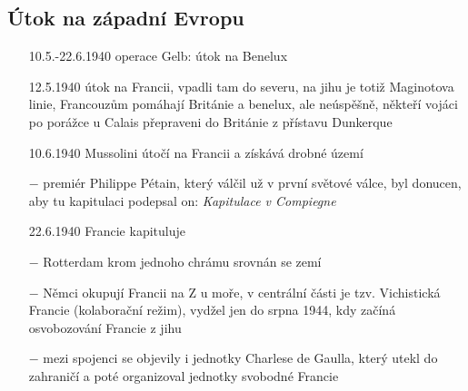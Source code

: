 \documentclass{article}
\begin{document}
\subsection*{Útok na západní Evropu}
\begin{itemize}
    \vspace{-0.5em}
    \setlength\itemsep{0.15em}
    \item[10.5.-22.6.1940] operace Gelb: útok na Benelux
    \item[12.5.1940] útok na Francii, vpadli tam do severu, na jihu je totiž Maginotova linie, Francouzům pomáhají Británie a benelux, ale neúspěšně, někteří vojáci po porážce u Calais přepraveni do Británie z přístavu Dunkerque
    \item[10.6.1940] Mussolini útočí na Francii a získává drobné území
    \item[$-$] premiér Philippe Pétain, který válčil už v první světové válce, byl donucen, aby tu kapitulaci podepsal on: \textit{Kapitulace v Compiegne}
    \item[22.6.1940] Francie kapituluje
    \item[$-$] Rotterdam krom jednoho chrámu srovnán se zemí
    \item[$-$] Němci okupují Francii na Z u moře, v centrální části je tzv. Vichistická Francie (kolaborační režim), vydžel jen do srpna 1944, kdy začíná osvobozování Francie z jihu
    \item[$-$] mezi spojenci se objevily i jednotky Charlese de Gaulla, který utekl do zahraničí a poté organizoval jednotky svobodné Francie
\end{itemize}
\end{document}
